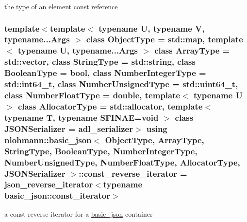 the type of an element const reference 

\subsubsection[{\texorpdfstring{const\+\_\+reverse\+\_\+iterator}{const_reverse_iterator}}]{\setlength{\rightskip}{0pt plus 5cm}template$<$template$<$ typename U, typename V, typename...\+Args $>$ class Object\+Type = std\+::map, template$<$ typename U, typename...\+Args $>$ class Array\+Type = std\+::vector, class String\+Type  = std\+::string, class Boolean\+Type  = bool, class Number\+Integer\+Type  = std\+::int64\+\_\+t, class Number\+Unsigned\+Type  = std\+::uint64\+\_\+t, class Number\+Float\+Type  = double, template$<$ typename U $>$ class Allocator\+Type = std\+::allocator, template$<$ typename T, typename S\+F\+I\+N\+A\+E=void $>$ class J\+S\+O\+N\+Serializer = adl\+\_\+serializer$>$ using {\bf nlohmann\+::basic\+\_\+json}$<$ Object\+Type, Array\+Type, String\+Type, Boolean\+Type, Number\+Integer\+Type, Number\+Unsigned\+Type, Number\+Float\+Type, Allocator\+Type, J\+S\+O\+N\+Serializer $>$\+::{\bf const\+\_\+reverse\+\_\+iterator} =  {\bf json\+\_\+reverse\+\_\+iterator}$<$typename {\bf basic\+\_\+json\+::const\+\_\+iterator}$>$}\hypertarget{classnlohmann_1_1basic__json_a72be3c24bfa24f0993d6c11af03e7404}{}\label{classnlohmann_1_1basic__json_a72be3c24bfa24f0993d6c11af03e7404}


a const reverse iterator for a \hyperlink{classnlohmann_1_1basic__json}{basic\+\_\+json} container 

